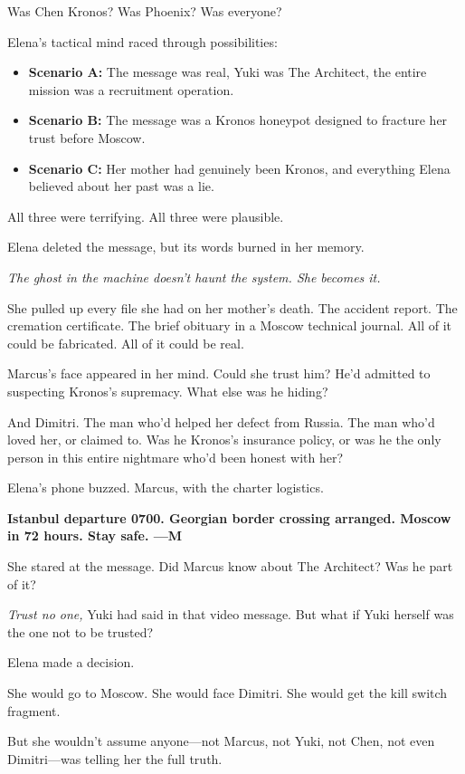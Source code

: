 Was Chen Kronos? Was Phoenix? Was everyone?

Elena's tactical mind raced through possibilities:

\begin{itemize}
\tightlist
\item
  \textbf{Scenario A:} The message was real, Yuki was The Architect, the entire mission was a recruitment operation.
\item
  \textbf{Scenario B:} The message was a Kronos honeypot designed to fracture her trust before Moscow.
\item
  \textbf{Scenario C:} Her mother had genuinely been Kronos, and everything Elena believed about her past was a lie.
\end{itemize}

All three were terrifying. All three were plausible.

Elena deleted the message, but its words burned in her memory.

\emph{The ghost in the machine doesn't haunt the system. She becomes it.}

She pulled up every file she had on her mother's death. The accident report. The cremation certificate. The brief obituary in a Moscow technical journal. All of it could be fabricated. All of it could be real.

Marcus's face appeared in her mind. Could she trust him? He'd admitted to suspecting Kronos's supremacy. What else was he hiding?

And Dimitri. The man who'd helped her defect from Russia. The man who'd loved her, or claimed to. Was he Kronos's insurance policy, or was he the only person in this entire nightmare who'd been honest with her?

Elena's phone buzzed. Marcus, with the charter logistics.

\textbf{Istanbul departure 0700. Georgian border crossing arranged. Moscow in 72 hours. Stay safe. ---M}

She stared at the message. Did Marcus know about The Architect? Was he part of it?

\emph{Trust no one,} Yuki had said in that video message. But what if Yuki herself was the one not to be trusted?

Elena made a decision.

She would go to Moscow. She would face Dimitri. She would get the kill switch fragment.

But she wouldn't assume anyone---not Marcus, not Yuki, not Chen, not even Dimitri---was telling her the full truth.

